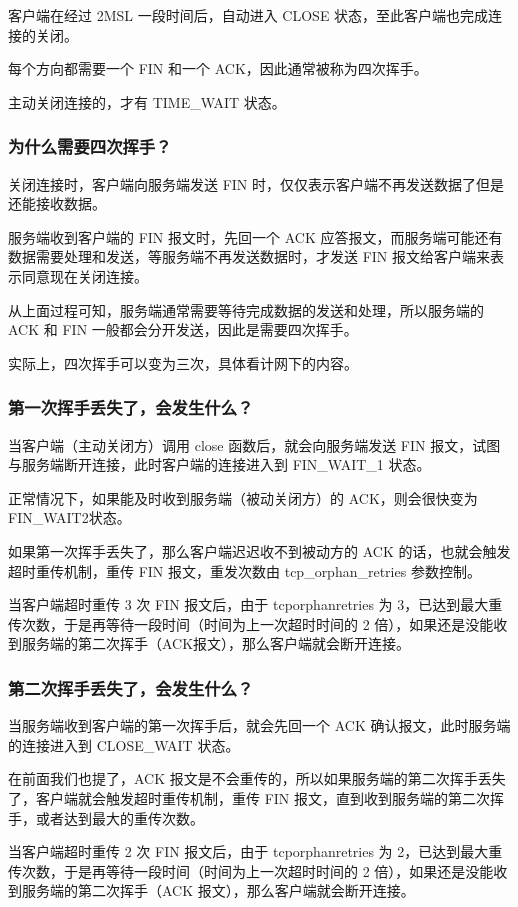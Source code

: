 \documentclass[11pt]{article}
\begin{document}
客户端在经过 2MSL 一段时间后，自动进入 CLOSE 状态，至此客户端也完成连接的关闭。

每个方向都需要一个 FIN 和一个 ACK，因此通常被称为四次挥手。

主动关闭连接的，才有 TIME\_WAIT 状态。
\subsubsection{为什么需要四次挥手？}
\label{sec:org415e9e4}
关闭连接时，客户端向服务端发送 FIN 时，仅仅表示客户端不再发送数据了但是还能接收数据。

服务端收到客户端的 FIN 报文时，先回一个 ACK 应答报文，而服务端可能还有数据需要处理和发送，等服务端不再发送数据时，才发送 FIN 报文给客户端来表示同意现在关闭连接。

从上面过程可知，服务端通常需要等待完成数据的发送和处理，所以服务端的 ACK 和 FIN 一般都会分开发送，因此是需要四次挥手。

实际上，四次挥手可以变为三次，具体看计网下的内容。
\subsubsection{第一次挥手丢失了，会发生什么？}
\label{sec:org89cddc3}
当客户端（主动关闭方）调用 close 函数后，就会向服务端发送 FIN 报文，试图与服务端断开连接，此时客户端的连接进入到 FIN\_WAIT\_1 状态。

正常情况下，如果能及时收到服务端（被动关闭方）的 ACK，则会很快变为 FIN\_WAIT2状态。

如果第一次挥手丢失了，那么客户端迟迟收不到被动方的 ACK 的话，也就会触发超时重传机制，重传 FIN 报文，重发次数由 tcp\_orphan\_retries 参数控制。

当客户端超时重传 3 次 FIN 报文后，由于 tcporphanretries 为 3，已达到最大重传次数，于是再等待一段时间（时间为上一次超时时间的 2 倍），如果还是没能收到服务端的第二次挥手（ACK报文），那么客户端就会断开连接。
\subsubsection{第二次挥手丢失了，会发生什么？}
\label{sec:orgf645fdc}
当服务端收到客户端的第一次挥手后，就会先回一个 ACK 确认报文，此时服务端的连接进入到 CLOSE\_WAIT 状态。

在前面我们也提了，ACK 报文是不会重传的，所以如果服务端的第二次挥手丢失了，客户端就会触发超时重传机制，重传 FIN 报文，直到收到服务端的第二次挥手，或者达到最大的重传次数。

当客户端超时重传 2 次 FIN 报文后，由于 tcporphanretries 为 2，已达到最大重传次数，于是再等待一段时间（时间为上一次超时时间的 2 倍），如果还是没能收到服务端的第二次挥手（ACK 报文），那么客户端就会断开连接。
\end{document}
